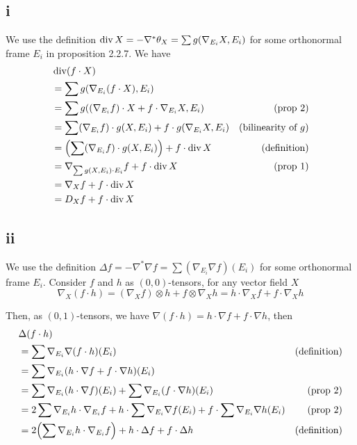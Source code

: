 \subsection{i}

We use the definition $\Div X = - \nabla^* \theta_X = \sum g(\nabla_{E_i} X, E_i)$ for some orthonormal frame $E_i$ in proposition 2.2.7. We have
\begin{align*}
	&\Div(f \cdot X) \\
	&= \sum g(\nabla_{E_i} (f \cdot X), E_i) \\
	&= \sum g((\nabla_{E_i} f) \cdot X + f \cdot \nabla_{E_i} X , E_i) &\text{(prop 2)}\\
	&= \sum (\nabla_{E_i} f) \cdot g(X, E_i)  + f \cdot g(\nabla_{E_i} X , E_i) &\text{(bilinearity of $g$)}\\
	&= \tuple*{\sum (\nabla_{E_i} f) \cdot g(X, E_i)}  + f \cdot \Div X &\text{(definition)}\\
	&= \nabla_{\sum g(X, E_i) \cdot E_i} f   + f \cdot \Div X &\text{(prop 1)}\\
	&= \nabla_X f   + f \cdot \Div X \\
	&= D_X f   + f \cdot \Div X
\end{align*}

\subsection{ii}

We use the definition $\Delta f = - \nabla^* \nabla f = \sum (\nabla_{E_i} \nabla f) (E_i)$ for some orthonormal frame $E_i$. Consider $f$ and $h$ as $(0, 0)$-tensors, for any vector field $X$
$$
	\nabla_X(f \cdot h) = (\nabla_X f) \otimes h + f \otimes \nabla_X h = h \cdot \nabla_X f +  f \cdot \nabla_X h
$$

Then, as $(0, 1)$-tensors, we have $\nabla (f \cdot h) = h \cdot \nabla f + f \cdot \nabla h$, then
\begin{align*}
	&\Delta (f \cdot h) \\
	&= \sum \nabla_{E_i} \nabla (f \cdot h)(E_i) &\text{(definition)}\\
	&= \sum \nabla_{E_i} (h \cdot \nabla f + f \cdot \nabla h)(E_i) \\
	&= \sum \nabla_{E_i} (h \cdot \nabla f)(E_i) + \sum \nabla_{E_i}(f \cdot \nabla h)(E_i) &\text{(prop 2)}\\
	&= 2 \sum \nabla_{E_i} h \cdot \nabla_{E_i} f + h \cdot \sum \nabla_{E_i} \nabla f (E_i) + f \cdot \sum \nabla_{E_i} \nabla h (E_i) &\text{(prop 2)}\\
	&= 2 \tuple*{\sum \nabla_{E_i} h \cdot \nabla_{E_i} f} + h \cdot \Delta f + f \cdot \Delta h &\text{(definition)}\\
\end{align*}

